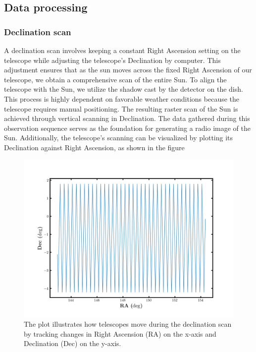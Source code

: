 \documentclass[12pt]{article}
\begin{document}
 \subsection{Data processing}

 \subsubsection{Declination scan}
 \label{S2.2}

A declination scan involves keeping a constant Right Ascension setting on the telescope while adjusting the telescope's Declination by computer. This adjustment ensures that as the sun moves across the fixed Right Ascension of our telescope, we obtain a comprehensive scan of the entire Sun. To align the telescope with the Sun, we utilize the shadow cast by the detector on the dish. This process is highly dependent on favorable weather conditions because the telescope requires manual positioning. The resulting raster scan of the Sun is achieved through vertical scanning in Declination. The data gathered during this observation sequence serves as the foundation for generating a radio image of the Sun. Additionally, the telescope's scanning can be visualized by plotting its Declination against Right Ascension, as shown in the figure 

 \begin{figure}[H]
 \centering
 \includegraphics[scale=.6]{fig/decscan.png}
 \caption{The plot illustrates how telescopes move during the declination scan by tracking changes in Right Ascension (RA) on the x-axis and Declination (Dec) on the y-axis.}
 \label{fig2.4}
 \end{figure}
\end{document}
